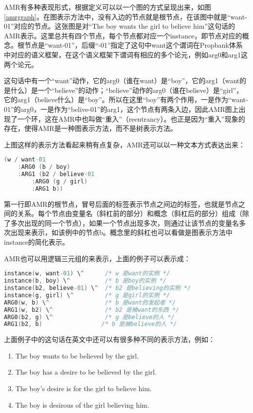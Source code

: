 \documentclass[master, winfont]{njuthesis}
\begin{document}
AMR有多种表现形式，根据定义可以以一个图的方式呈现出来，如图\ref{amrgraph}。在图表示方法中，没有入边的节点就是根节点，在该图中就是“want-01”对应的节点。这张图是对“The boy wants the girl to believe him”这句话的AMR表示。这里总共有四个节点，每个节点都对应一个instance，即节点对应的概念。根节点是“want-01”，后缀“-01”指定了这句中want这个谓词在Propbank体系中对应的语义框架，在这个语义框架下谓词有相应的多个论元，例如arg0和arg1这两个论元。

这句话中有一个“want”动作，它的arg0（谁在want）是“boy”，它的arg1（want的是什么）是一个“believe”的动作；“believe”动作的arg0（谁在believe）是“girl”，它的arg1（believe什么）是“boy”。所以在这里“boy”有两个作用，一是作为“want-01”的arg0，一是作为“belive-01”的arg1，这个节点有两条入边，因此AMR图上出现了一个环，这在AMR中也叫做“重入”（reentrancy）。也正是因为“重入”现象的存在，使得AMR是一种图表示方法，而不是树表示方法。

上图这样的表示方法看起来稍有点复杂，AMR还可以以一种文本方式表达出来：
\begin{lstlisting}[language=C]
 (w / want-01 
	:ARG0 (b / boy)
	:ARG1 (b2 / believe-01
		:ARG0 (g / girl)
		:ARG1 b))
\end{lstlisting}
 

第一行即AMR的根节点，冒号后面的标签表示节点之间边的标签，也就是节点之间的关系。每个节点由变量名（斜杠前的部分）和概念（斜杠后的部分）组成（除了多次出现的同一个节点），如果一个节点出现多次，则通过让该节点的变量名多次出现来表示，如该例中的节点b。概念里的斜杠也可以看做是图表示方法中instance的简化表示。

AMR也可以用逻辑三元组的来表示，上面的例子可以表示成：
\begin{lstlisting}[language=C]
instance(w, want-01) \^      /* w 是want的实例 */ 
instance(b, boy) \^          /* b 是boy的实例 */ 
instance(b2, believe-01) \^  /* b2 是believing的实例 */ 
instance(g, girl) \^         /* g 是girl的实例 */ 
ARG0(w, b) \^                /* b 是want的发起者 */ 
ARG1(w, b2) \^               /* b2 是被want的东西 */ 
ARG0(b2, g) \^               /* g 是believe的人 */ 
ARG1(b2, b)                 /* b 是被believe的人 */
\end{lstlisting}

上面例子中的这句话在英文中还可以有很多种不同的表示方法，例如：
\begin{enumerate}
  \item The boy wants to be believed by the girl.
  \item The boy has a desire to be believed by the girl.
  \item The boy’s desire is for the girl to believe him.
  \item The boy is desirous of the girl believing him.
\end{enumerate}
\end{document}
